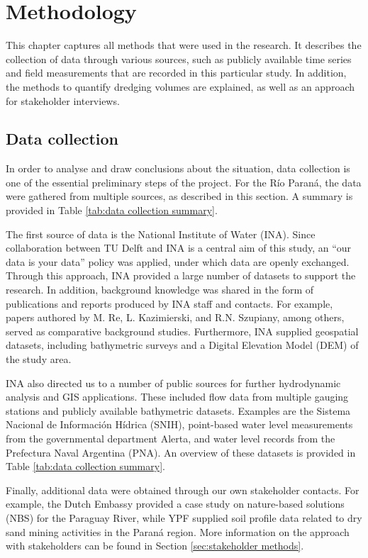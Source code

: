 \chapter{Methodology}
\label{chap:methodology}

This chapter captures all methods that were used in the research. It describes the collection of data through various sources, such as publicly available time series and field measurements that are recorded in this particular study. In addition, the methods to quantify dredging volumes are explained, as well as an approach for stakeholder interviews.

\section{Data collection}
In order to analyse and draw conclusions about the situation, data collection is one of the essential preliminary steps of the project. For the Río Paraná, the data were gathered from multiple sources, as described in this section. A summary is provided in Table \ref{tab:data collection summary}.

The first source of data is the National Institute of Water (INA). Since collaboration between TU Delft and INA is a central aim of this study, an “our data is your data” policy was applied, under which data are openly exchanged. Through this approach, INA provided a large number of datasets to support the research. In addition, background knowledge was shared in the form of publications and reports produced by INA staff and contacts. For example, papers authored by M. Re, L. Kazimierski, and R.N. Szupiany, among others, served as comparative background studies. Furthermore, INA supplied geospatial datasets, including bathymetric surveys and a Digital Elevation Model (DEM) of the study area.

INA also directed us to a number of public sources for further hydrodynamic analysis and GIS applications. These included flow data from multiple gauging stations and publicly available bathymetric datasets. Examples are the Sistema Nacional de Información Hídrica (SNIH), point-based water level measurements from the governmental department Alerta, and water level records from the Prefectura Naval Argentina (PNA). An overview of these datasets is provided in Table \ref{tab:data collection summary}.

Finally, additional data were obtained through our own stakeholder contacts. For example, the Dutch Embassy provided a case study on nature-based solutions (NBS) for the Paraguay River, while YPF supplied soil profile data related to dry sand mining activities in the Paraná region. More information on the approach with stakeholders can be found in Section \ref{sec:stakeholder methods}.

